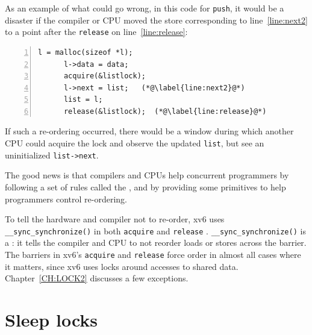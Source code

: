 As an example of what could go wrong,
in this code for
\lstinline{push},
it would be a disaster if the compiler or CPU moved the
store corresponding to
line~\ref{line:next2} to a point after the
\lstinline{release}
on line~\ref{line:release}:
\begin{lstlisting}[numbers=left,firstnumber=1]
      l = malloc(sizeof *l);
      l->data = data;
      acquire(&listlock);
      l->next = list;   (*@\label{line:next2}@*)
      list = l;      
      release(&listlock);  (*@\label{line:release}@*)
\end{lstlisting}
If such a re-ordering occurred, there would be a window during
which another CPU could acquire the lock and
observe the updated
\lstinline{list},
but see an uninitialized
\lstinline{list->next}.

The good news is that compilers and CPUs help concurrent programmers
by following a set of rules called the , and
by providing some primitives to help programmers control re-ordering.

To tell the hardware and compiler not to re-order,
xv6 uses
\lstinline{__sync_synchronize()} 
in both
\lstinline{acquire} 
and
\lstinline{release} .
\lstinline{__sync_synchronize()}
is a :
it tells the compiler and CPU to not reorder loads or stores across the
barrier.
The barriers in xv6's 
\lstinline{acquire}
and
\lstinline{release}
force order in almost all cases where it matters,
since xv6 uses locks around accesses to shared data.
Chapter~\ref{CH:LOCK2} discusses a few exceptions.

\section{Sleep locks}


